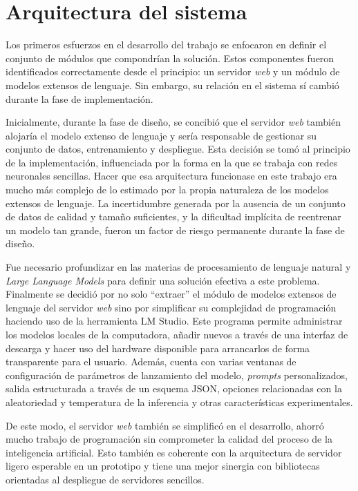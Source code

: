 \section{Arquitectura del sistema}

Los primeros esfuerzos en el desarrollo del trabajo se enfocaron en definir el conjunto de módulos que compondrían la solución.
Estos componentes fueron identificados correctamente desde el principio:
un servidor \textit{web} y un módulo de modelos extensos de lenguaje.
Sin embargo, su relación en el sistema sí cambió durante la fase de implementación.

Inicialmente, durante la fase de diseño, se concibió que el servidor \textit{web} también alojaría el modelo extenso de lenguaje 
y sería responsable de gestionar su conjunto de datos, entrenamiento y despliegue.
Esta decisión se tomó al principio de la implementación,
influenciada por la forma en la que se trabaja con redes neuronales sencillas.
Hacer que esa arquitectura funcionase en este trabajo era mucho más complejo de lo estimado
por la propia naturaleza de los modelos extensos de lenguaje.
La incertidumbre generada por la ausencia de un conjunto de datos de calidad y tamaño suficientes,
y la dificultad implícita de reentrenar un modelo tan grande,
fueron un factor de riesgo permanente durante la fase de diseño.

Fue necesario profundizar en las materias de procesamiento de lenguaje natural y \textit{Large Language Models} \cite{fiubaLlm}
para definir una solución efectiva a este problema.
Finalmente se decidió por no solo ``extraer'' el módulo de modelos extensos de lenguaje del servidor \textit{web}
sino por simplificar su complejidad de programación haciendo uso de la herramienta LM Studio.
Este programa permite administrar los modelos locales de la computadora,
añadir nuevos a través de una interfaz de descarga
y hacer uso del hardware disponible para arrancarlos de forma transparente para el usuario.
Además, cuenta con varias ventanas de configuración de parámetros de lanzamiento del modelo, \textit{prompts} personalizados,
salida estructurada a través de un esquema JSON,
opciones relacionadas con la aleatoriedad y temperatura de la inferencia y otras características experimentales.

De este modo, el servidor \textit{web} también se simplificó en el desarrollo, ahorró mucho trabajo de programación sin
comprometer la calidad del proceso de la inteligencia artificial.
Esto también es coherente con la arquitectura de servidor ligero esperable en un prototipo
y tiene una mejor sinergia con bibliotecas orientadas al despliegue de servidores sencillos.

